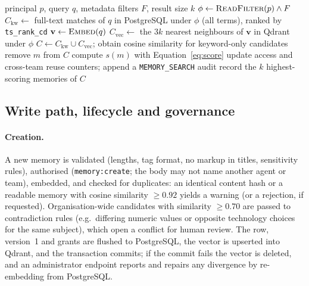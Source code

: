\documentclass[11pt,a4paper]{article}
\begin{document}
\begin{algorithm}[htbp]
\caption{Permission-aware hybrid search}
\label{alg:search}
\begin{algorithmic}[1]
\Require principal $p$, query $q$, metadata filters $F$, result size $k$
\State $\phi \gets \textsc{ReadFilter}(p) \land F$ 
\State $C_{\mathrm{kw}} \gets$ full-text matches of $q$ in PostgreSQL under $\phi$ (all terms), ranked by \texttt{ts\_rank\_cd}
\State $\mathbf{v} \gets \textsc{Embed}(q)$
\State $C_{\mathrm{vec}} \gets$ the $3k$ nearest neighbours of $\mathbf{v}$ in Qdrant under $\phi$
\State $C \gets C_{\mathrm{kw}} \cup C_{\mathrm{vec}}$; obtain cosine similarity for keyword-only candidates
    \State remove $m$ from $C$ 
  \EndIf
  \State compute $s(m)$ with Equation~\eqref{eq:score}
\EndFor
\State update access and cross-team reuse counters; append a \texttt{MEMORY\_SEARCH} audit record
\State \Return the $k$ highest-scoring memories of $C$
\end{algorithmic}
\end{algorithm}

\subsection{Write path, lifecycle and governance}
\label{sec:lifecycle}

\paragraph{Creation.} A new memory is validated (lengths, tag format, no markup in titles, sensitivity
rules), authorised (\texttt{memory:create}; the body may not name another agent or team), embedded, and
checked for duplicates: an identical content hash or a readable memory with cosine similarity
$\geq 0.92$ yields a warning (or a rejection, if requested). Organisation-wide candidates with similarity
$\geq 0.70$ are passed to contradiction rules (e.g.\ differing numeric values or opposite technology
choices for the same subject), which open a conflict for human review. The row, version~1 and grants are
flushed to PostgreSQL, the vector is upserted into Qdrant, and the transaction commits; if the commit
fails the vector is deleted, and an administrator endpoint reports and repairs any divergence by
re-embedding from PostgreSQL.
\end{document}
